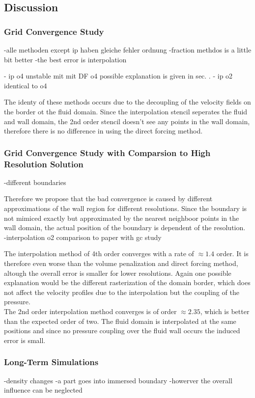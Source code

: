 \subsection{Discussion}
\subsubsection{Grid Convergence Study}


-alle methoden except ip haben gleiche fehler ordnung
-fraction methdos is a little bit better
-the best error is interpolation

- ip o4 unstable mit mit DF o4 possible explanation is given in sec. .
- ip o2 identical to o4


 The identy of these methods occurs due to the decoupling of the velocity fields
on the border ot the fluid domain. Since the interpolation stencil seperates the fluid and wall domain, the 2nd order
stencil doesn't see any points in the wall domain, therefore there is no difference in using the direct forcing method.\\

\subsubsection{Grid Convergence Study with Comparsion to High Resolution Solution}
\label{vali:hpflow_discussion}

-different boundaries

Therefore we propose that the bad convergence is caused by different approximations of the wall region for different resolutions.
Since the boundary is not mimiced exactly but approximated by the nearest neighboor points in the wall domain, the actual position
of the boundary is dependent of the resolution.\\

-interpolation o2  comparison to paper with gc study

The interpolation method of 4th order converges with a rate of $\approx 1.4$ order. It is therefore even worse than the volume penalization and
direct forcing method, altough the overall error is smaller for lower resolutions. Again one possible explanation would be the different rasterization
of the domain border, which does not affect the velocity profiles due to the interpolation but the coupling of the pressure.\\
The 2nd order interpolation method converges is of order $\approx 2.35$, which is better than the expected order of two.
The fluid domain is interpolated at the same positions and since no pressure coupling over the fluid wall occurs the induced error is small.

\subsubsection{Long-Term Simulations}
-density changes
-a part goes into immersed boundary
-howerver the overall influence can be neglected


